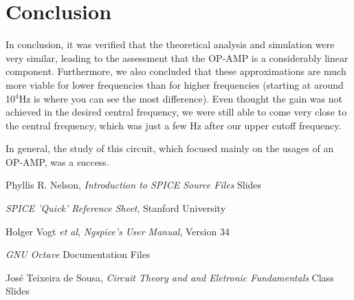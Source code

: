 \clearpage
\section{Conclusion}
\label{sec:conclusion}

In conclusion, it was verified that the theoretical analysis and simulation were very similar, leading to the assessment that the OP-AMP is a considerably linear component. Furthermore, we also concluded that these approximations are much more viable for lower frequencies than for higher frequencies (starting at around 10$^4$Hz is where you can see the most difference).
Even thought the gain was not achieved in the desired central frequency, we were still able to come very close to the central frequency, which was just a few Hz after our upper cutoff frequency.

In general, the study of this circuit, which focused mainly on the usages of an OP-AMP, was a success.

\begin{thebibliography}{}

Phyllis R. Nelson, \emph{Introduction to SPICE Source Files} Slides

\emph{SPICE 'Quick' Reference Sheet}, Stanford University

Holger Vogt \textit{et al}, \emph{Ngspice's User Manual}, Version 34

\emph{GNU Octave} Documentation Files 

José Teixeira de Sousa, \emph{Circuit Theory and and Eletronic Fundamentals} Class Slides

\end{thebibliography}